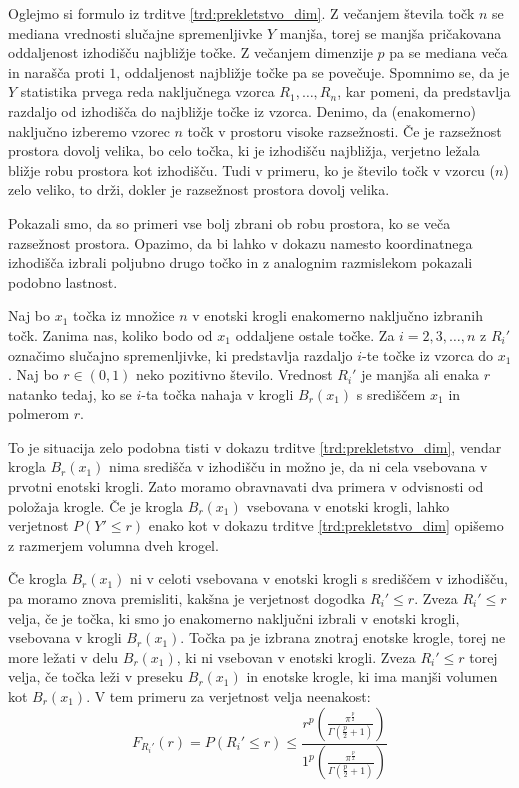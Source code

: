 \documentclass[12pt,a4paper,twoside]{article}
\theoremstyle{definition} %
\theoremstyle{plain} %
\numberwithin{equation}{section}  %
\begin{document}
Oglejmo si formulo iz trditve \ref{trd:prekletstvo_dim}.
Z večanjem števila točk $n$ se mediana vrednosti slučajne spremenljivke $Y$ manjša, torej se manjša pričakovana oddaljenost izhodišču najbližje točke.
Z večanjem dimenzije $p$ pa se mediana veča in narašča proti $1$, oddaljenost najbližje točke pa se povečuje.
Spomnimo se, da je $Y$ statistika prvega reda naključnega vzorca $R_1, \ldots, R_n$, kar pomeni, da predstavlja razdaljo od izhodišča do najbližje točke iz vzorca.
Denimo, da (enakomerno) naključno izberemo vzorec $n$ točk v prostoru visoke razsežnosti.
Če je razsežnost prostora dovolj velika, bo celo točka, ki je izhodišču najbližja, verjetno ležala bližje robu prostora kot izhodišču.
Tudi v primeru, ko je število točk v vzorcu ($n$) zelo veliko, to drži, dokler je razsežnost prostora dovolj velika.

Pokazali smo, da so primeri vse bolj zbrani ob robu prostora, ko se veča razsežnost prostora. 
Opazimo, da bi lahko v dokazu namesto koordinatnega izhodišča izbrali poljubno drugo točko in z analognim razmislekom pokazali podobno lastnost.

Naj bo $x_1$ točka iz množice $n$ v enotski krogli enakomerno naključno izbranih točk.
Zanima nas, koliko bodo od $x_1$ oddaljene ostale točke. 
Za $i=2,3,\ldots, n$ z $R_i'$ označimo slučajno spremenljivke, ki predstavlja razdaljo $i$-te točke iz vzorca do $x_1$. 
Naj bo $r \in (0,1)$ neko pozitivno število.
Vrednost $R_i'$ je manjša ali enaka $r$ natanko tedaj, ko se $i$-ta točka nahaja v krogli $B_{r}(x_1)$ s središčem $x_1$ in polmerom $r$. 

To je situacija zelo podobna tisti v dokazu trditve \ref{trd:prekletstvo_dim}, vendar krogla $B_{r}(x_1)$ nima središča v izhodišču in možno je, da ni cela vsebovana v prvotni enotski krogli.
Zato moramo obravnavati dva primera v odvisnosti od položaja krogle.
Če je krogla $B_r(x_1)$ vsebovana v enotski krogli, lahko verjetnost $P(Y' \leq r)$ enako kot v dokazu trditve \ref{trd:prekletstvo_dim} opišemo z razmerjem volumna dveh krogel.

Če krogla $B_r(x_1)$ ni v celoti vsebovana v enotski krogli s središčem v izhodišču, pa moramo znova premisliti, kakšna je verjetnost dogodka $R_i' \leq r$.
Zveza $R_i' \leq r$ velja, če je točka, ki smo jo enakomerno naključni izbrali v enotski krogli, vsebovana v krogli $B_r(x_1)$.
Točka pa je izbrana znotraj enotske krogle, torej ne more ležati v delu $B_r(x_1)$, ki ni vsebovan v enotski krogli.
Zveza $R_i' \leq r$ torej velja, če točka leži v preseku $B_r(x_1)$ in enotske krogle, ki ima manjši volumen kot $B_r(x_1)$.
V tem primeru za verjetnost velja neenakost:
\begin{equation}
\label{eq:presek_krogel}
	F_{R_i'}(r) = P(R_i' \leq r) \leq 
	\frac{r^p \left( \frac{\pi^{\frac{p}{2}}}{\Gamma (\frac{p}{2}+1)} \right)}{1^p \left( \frac{\pi^{\frac{p}{2}}}{\Gamma (\frac{p}{2}+1)} \right)}
\end{equation}
\end{document}
